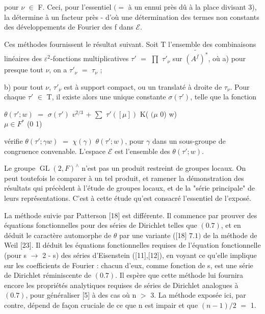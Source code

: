 \documentclass[10pt,a4paper]{article}
\begin{document}
\clearpage
{}
\label{d035-physical-007}
\par pour $\nu{}$ $\in{}$ F. Ceci, pour l'essentiel $(=$ à un ennui près dû à la place divisant 3), la détermine à un facteur près - d'où une détermination des termes non constants des développements de Fourier des f dans $\mathcal{E}$.\par
\par Ces méthodes fournissent le résultat suivant. Soit T l'ensemble des combinaisons linéaires des $\varepsilon{}^{2}$-fonctions multiplicatives $\tau{}'$ $=$ $\prod{}$ $\tau{}'_\nu{}$ sur $\widetilde{(A^f)^*}$, où a) pour presque tout $\nu{}$, on a $\tau{}'_\nu{}$ $=$ $\tau{}_\nu{}$ ;\par
\par b) pour tout $\nu{}$, $\tau{}'_\nu{}$ est à support compact, ou un translaté à droite de $\tau{}_\nu{}$. Pour chaque $\tau{}'$ $\in{}$ T, il existe alors une unique constante $\sigma{}(\tau{}')$, telle que la fonction\par
\par\smallskip\begin{center}\begin{minipage}{0.96\textwidth}\centering
$\theta{}(\tau{}';w)$ $=$ $\sigma{}(\tau{}')$ $v^{2/3}$ + $\sum{}$ $\tau{}'([\mu{}])$ K( $(\mu{}$ 0) w) \\ $\mu{}\in{}F^*$ (0 1)
\end{minipage}\end{center}\smallskip
\par vérifie $\theta{}(\tau{}';\gamma{}w)$ $=$ $\chi{}(\gamma{})$ $\theta{}(\tau{}';w)$, pour $\gamma{}$ dans un sous-groupe de congruence convenable. L'espace $\mathcal{E}$ est l'ensemble des $\theta{}(\tau{}';w)$.\par
\par Le groupe $\operatorname{GL}(2,F)^\wedge{}$ n'est pas un produit restreint de groupes locaux. On peut toutefois le comparer à un tel produit, et ramener la démonstration des résultats qui précèdent à l'étude de groupes locaux, et de la "série principale" de leurs représentations. C'est à cette étude qu'est consacré l'essentiel de l'exposé.\par
\par La méthode suivie par Patterson [18] est différente. Il commence par prouver des équations fonctionnelles pour des séries de Dirichlet telles que $(0.7)$, et en déduit le caractère automorphe de $\theta{}$ par une variante ([18] $7.1)$ de la méthode de Weil [23]. Il déduit les équations fonctionnelles requises de l'équation fonctionnelle (pour s $\to{}$ 2 - s) des séries d'Eisenstein ([11],[12]), en voyant ce qu'elle implique sur les coefficients de Fourier : chacun d'eux, comme fonction de s, est une série de Dirichlet réminiscente de $(0.7)$. Il espère que cette méthode lui fournira encore les propriétés analytiques requises de séries de Dirichlet analogues à $(0.7)$, pour généraliser [5] à des cas où n $>$ 3. La méthode exposée ici, par contre, dépend de façon cruciale de ce que n est impair et que $(n-1)/2$ $=$ 1.\par
\end{document}
